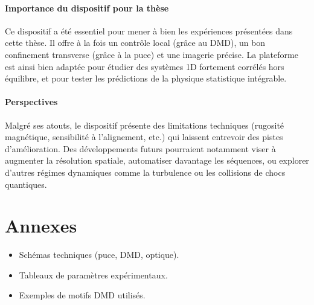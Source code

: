 \paragraph{Importance du dispositif pour la thèse}  
Ce dispositif a été essentiel pour mener à bien les expériences présentées dans cette thèse. Il offre à la fois un contrôle local (grâce au DMD), un bon confinement transverse (grâce à la puce) et une imagerie précise. La plateforme est ainsi bien adaptée pour étudier des systèmes 1D fortement corrélés hors équilibre, et pour tester les prédictions de la physique statistique intégrable.

\paragraph{Perspectives}  
Malgré ses atouts, le dispositif présente des limitations techniques (rugosité magnétique, sensibilité à l’alignement, etc.) qui laissent entrevoir des pistes d’amélioration. Des développements futurs pourraient notamment viser à augmenter la résolution spatiale, automatiser davantage les séquences, ou explorer d'autres régimes dynamiques comme la turbulence ou les collisions de chocs quantiques.



\section*{Annexes}
\begin{itemize}
    \item Schémas techniques (puce, DMD, optique).
    \item Tableaux de paramètres expérimentaux.
    \item Exemples de motifs DMD utilisés.
\end{itemize}